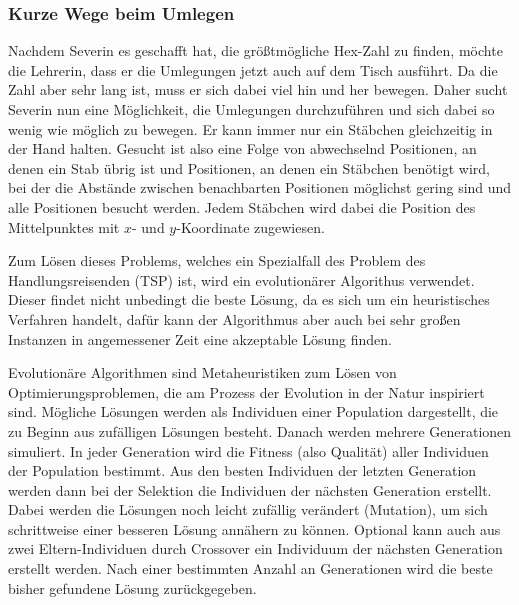 \documentclass[a4paper,10pt,ngerman]{scrartcl}
\begin{document}
\subsubsection{Kurze Wege beim Umlegen}
Nachdem Severin es geschafft hat, die größtmögliche Hex-Zahl zu finden, möchte die Lehrerin, dass er die Umlegungen jetzt auch auf dem Tisch ausführt. Da die Zahl aber sehr lang ist, muss er sich dabei viel hin und her bewegen. Daher sucht Severin nun eine Möglichkeit, die Umlegungen durchzuführen und sich dabei so wenig wie möglich zu bewegen. 
Er kann immer nur ein Stäbchen gleichzeitig in der Hand halten.
Gesucht ist also eine Folge von abwechselnd Positionen, an denen ein Stab übrig ist und Positionen, an denen ein Stäbchen benötigt wird, bei der die Abstände zwischen benachbarten Positionen möglichst gering sind und alle Positionen besucht werden.
Jedem Stäbchen wird dabei die Position des Mittelpunktes mit $x$- und $y$-Koordinate zugewiesen. 

Zum Lösen dieses Problems, welches ein Spezialfall des Problem des Handlungsreisenden (TSP) ist, wird ein evolutionärer Algorithus verwendet. 
Dieser findet nicht unbedingt die beste Lösung, da es sich um ein heuristisches Verfahren handelt, dafür kann der Algorithmus aber auch bei sehr großen Instanzen in angemessener Zeit eine akzeptable Lösung finden. 

Evolutionäre Algorithmen sind Metaheuristiken zum Lösen von Optimierungsproblemen, die am Prozess der Evolution in der Natur inspiriert sind. 
Mögliche Lösungen werden als Individuen einer Population dargestellt, die zu Beginn aus zufälligen Lösungen besteht. 
Danach werden mehrere Generationen simuliert. 
In jeder Generation wird die Fitness (also Qualität) aller Individuen der Population bestimmt.
Aus den besten Individuen der letzten Generation werden dann bei der Selektion die Individuen der nächsten Generation erstellt. 
Dabei werden die Lösungen noch leicht zufällig verändert (Mutation), um sich schrittweise einer besseren Lösung annähern zu können.
Optional kann auch aus zwei Eltern-Individuen durch Crossover ein Individuum der nächsten Generation erstellt werden. 
Nach einer bestimmten Anzahl an Generationen wird die beste bisher gefundene Lösung zurückgegeben.
\end{document}
